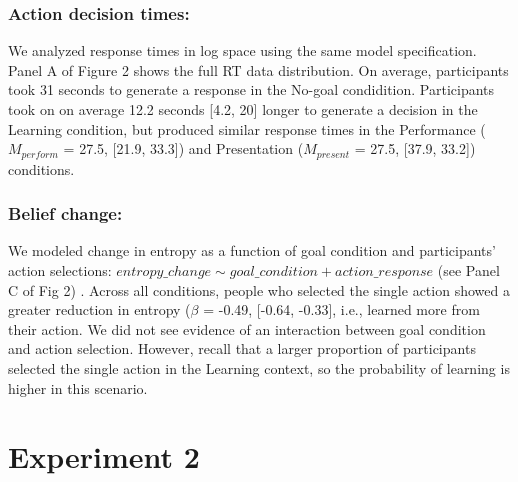 \documentclass[10pt, letterpaper]{article}
\begin{document}
\subsubsection{Action decision times:}\label{action-decision-times}

We analyzed response times in log space using the same model
specification. Panel A of Figure 2 shows the full RT data distribution.
On average, participants took 31 seconds to generate a response in the
No-goal condidition. Participants took on on average 12.2 seconds
{[}4.2, 20{]} longer to generate a decision in the Learning condition,
but produced similar response times in the Performance (\(M_{perform}\)
= 27.5, {[}21.9, 33.3{]}) and Presentation (\(M_{present}\) = 27.5,
{[}37.9, 33.2{]}) conditions.

\subsubsection{Belief change:}\label{belief-change}

We modeled change in entropy as a function of goal condition and
participants' action selections:
\texttt{$entropy\_change \sim goal\_condition + action\_response$} (see
Panel C of Fig 2) . Across all conditions, people who selected the
single action showed a greater reduction in entropy (\(\beta\) = -0.49,
{[}-0.64, -0.33{]}, i.e., learned more from their action. We did not see
evidence of an interaction between goal condition and action selection.
However, recall that a larger proportion of participants selected the
single action in the Learning context, so the probability of learning is
higher in this scenario.

\section{Experiment 2}\label{experiment-2}
\end{document}
